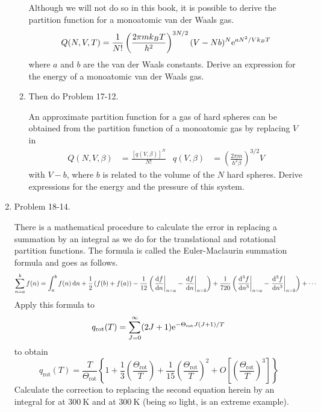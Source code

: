 \documentclass[../psets.tex]{subfiles}
\begin{document}
\begin{enumerate}
\begin{enumerate}
        Although we will not do so in this book, it is possible to derive the partition function for a monoatomic van der Waals gas.
        \begin{equation*}
            Q(N,V,T) = \frac{1}{N!}\left( \frac{2\pi mk_BT}{h^2} \right)^{3N/2}(V-Nb)^N\e[aN^2/Vk_BT]
        \end{equation*}
        where $a$ and $b$ are the van der Waals constants. Derive an expression for the energy of a monoatomic van der Waals gas.
        \item Then do Problem 17-12.\par
        An approximate partition function for a gas of hard spheres can be obtained from the partition function of a monoatomic gas by replacing $V$ in
        \begin{align*}
            Q(N,V,\beta) &= \frac{[q(V,\beta)]^N}{N!}&
            q(V,\beta) &= \left( \frac{2\pi m}{h^2\beta} \right)^{3/2}V
        \end{align*}
        with $V-b$, where $b$ is related to the volume of the $N$ hard spheres. Derive expressions for the energy and the pressure of this system.
    \end{enumerate}
    \item Problem 18-14.\par
    There is a mathematical procedure to calculate the error in replacing a summation by an integral as we do for the translational and rotational partition functions. The formula is called the Euler-Maclaurin summation formula and goes as follows.
    \begin{equation*}
        \sum_{n=a}^bf(n) = \int_a^bf(n)\dd{n}+\frac{1}{2}\left( f(b)+f(a) \right)-\frac{1}{12}\left( \eval{\dv{f}{n}}_{n=a}-\eval{\dv{f}{n}}_{n=b} \right)+\frac{1}{720}\left( \eval{\dv[3]{f}{n}}_{n=a}-\eval{\dv[3]{f}{n}}_{n=b} \right)+\cdots
    \end{equation*}
    Apply this formula to
    \begin{equation*}
        q_\text{rot}(T) = \sum_{J=0}^\infty(2J+1)\e[-\Theta_\text{rot}J(J+1)/T]
    \end{equation*}
    to obtain
    \begin{equation*}
        q_\text{rot}(T) = \frac{T}{\Theta_\text{rot}}\left\{ 1+\frac{1}{3}\left( \frac{\Theta_\text{rot}}{T} \right)+\frac{1}{15}\left( \frac{\Theta_\text{rot}}{T} \right)^2+O\left[ \left( \frac{\Theta_\text{rot}}{T} \right)^3 \right] \right\}
    \end{equation*}
    Calculate the correction to replacing the second equation herein by an integral for  at $\SI{300}{\kelvin}$ and  at $\SI{300}{\kelvin}$ (being so light,  is an extreme example).

\end{enumerate}
\end{document}
